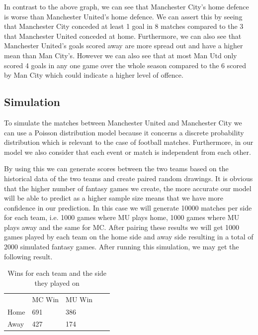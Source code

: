 \documentclass[11pt]{report}
\begin{document}
\vspace{0.3cm}
\noindent
In contrast to the above graph, we can see that Manchester City's home defence is worse than Manchester United's home defence. We can assert this by seeing that Manchester City conceded at least 1 goal in 8 matches compared to the 3 that Manchester United conceded at home. Furthermore, we can also see that Manchester United's goals scored away are more spread out and have a higher mean than Man City's. However we can also see that at most Man Utd only scored 4 goals in any one game over the whole season compared to the 6 scored by Man City which could indicate a higher level of offence. 

\subsection{Simulation}
\vspace{0.3cm}

To simulate the matches between Manchester United and Manchester City we can use a Poisson distribution model because it concerns a discrete probability distribution which is relevant to the case of football matches. Furthermore, in our model we also consider that each event or match is independent from each other.

\vspace{0.3cm}
\noindent
By using this we can generate scores between the two teams based on the historical data of the two teams and create paired random drawings. It is obvious that the higher number of fantasy games we create, the more accurate our model will be able to predict as a higher sample size means that we have more confidence in our prediction. In this case we will generate 10000 matches per side for each team, i.e. 1000 games where MU plays home, 1000 games where MU plays away and the same for MC. After pairing these results we will get 1000 games played by each team on the home side and away side resulting in a total of 2000 simulated fantasy games. After running this simulation, we may get the following result.

\newpage
\begin{table}[ht]
\centering
\caption{Wins for each team and the side they played on}
\begin{tabular}{lllll}
         & MC Win & MU Win &  &  \\
Home  & 691 & 386 &  &  \\
Away & 427 & 174 &  &  \\
\end{tabular}
\end{table}
\end{document}
